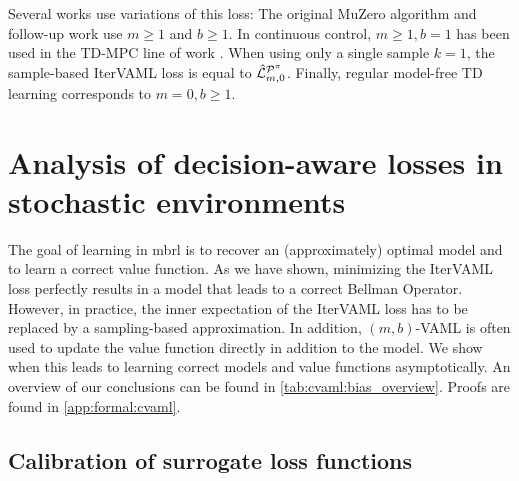 Several works use variations of this loss:
The original MuZero algorithm \parencite{schrittwieser2020mastering} and follow-up work \parencite{ye2021mastering,antonoglou2022planning} use $m\geq1$ and $b\geq1$.
In continuous control, $m\geq1,b=1$ has been used in the TD-MPC line of work \parencite{hansen2022temporal,hansen2024tdmpc}.
When using only a single sample $k=1$, the sample-based IterVAML loss is equal to $\hat{\mathcal{L}}^{\P^\pi}_{m,0}$.
Finally, regular model-free TD learning corresponds to $m=0,b\geq1$.


\section{Analysis of decision-aware losses in stochastic environments}
\label{sec:cvaml:theory_1}
The goal of learning in \ac{mbrl} is to recover an (approximately) optimal model and to learn a correct value function.
As we have shown, minimizing the IterVAML loss perfectly results in a model that leads to a correct Bellman Operator.
However, in practice, the inner expectation of the IterVAML loss has to be replaced by a sampling-based approximation.
In addition, $(m,b)$-VAML is often used to update the value function directly in addition to the model.
We show when this leads to learning correct models and value functions asymptotically.
An overview of our conclusions can be found in \autoref{tab:cvaml:bias_overview}.
Proofs are found in \autoref{app:formal:cvaml}.
\subsection{Calibration of surrogate loss functions}

